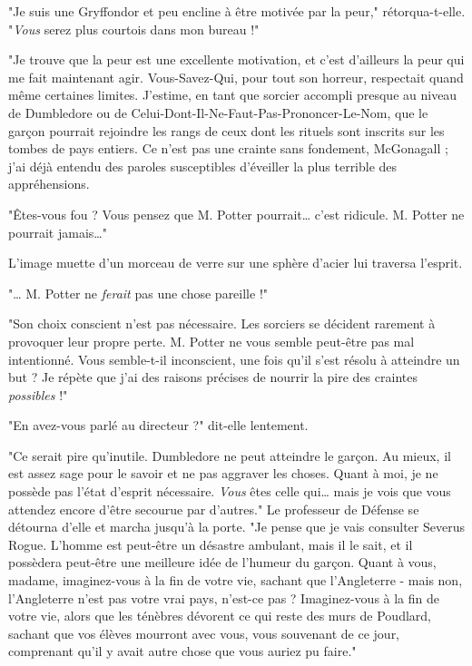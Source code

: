 "Je suis une Gryffondor et peu encline à être motivée par la peur," rétorqua-t-elle. "\emph{Vous}  serez plus courtois dans mon bureau !"

"Je trouve que la peur est une excellente motivation, et c'est d'ailleurs la peur qui me fait maintenant agir. Vous-Savez-Qui, pour tout son horreur, respectait quand même certaines limites. J'estime, en tant que sorcier accompli presque au niveau de Dumbledore ou de Celui-Dont-Il-Ne-Faut-Pas-Prononcer-Le-Nom, que le garçon pourrait rejoindre les rangs de ceux dont les rituels sont inscrits sur les tombes de pays entiers. Ce n'est pas une crainte sans fondement, McGonagall ; j'ai déjà entendu des paroles susceptibles d'éveiller la plus terrible des appréhensions.

"Êtes-vous fou ? Vous pensez que M. Potter pourrait… c'est ridicule. M. Potter ne pourrait jamais…"

L'image muette d'un morceau de verre sur une sphère d'acier lui traversa l'esprit.

"… M. Potter ne \emph{ferait}  pas une chose pareille !"

"Son choix conscient n'est pas nécessaire. Les sorciers se décident rarement à provoquer leur propre perte. M. Potter ne vous semble peut-être pas mal intentionné. Vous semble-t-il inconscient, une fois qu'il s'est résolu à atteindre un but ? Je répète que j'ai des raisons précises de nourrir la pire des craintes \emph{possibles}  !"

"En avez-vous parlé au directeur ?" dit-elle lentement.

"Ce serait pire qu'inutile. Dumbledore ne peut atteindre le garçon. Au mieux, il est assez sage pour le savoir et ne pas aggraver les choses. Quant à moi, je ne possède pas l'état d'esprit nécessaire. \emph{Vous}  êtes celle qui… mais je vois que vous attendez encore d'être secourue par d'autres." Le professeur de Défense se détourna d'elle et marcha jusqu'à la porte. "Je pense que je vais consulter Severus Rogue. L'homme est peut-être un désastre ambulant, mais il le sait, et il possèdera peut-être une meilleure idée de l'humeur du garçon. Quant à vous, madame, imaginez-vous à la fin de votre vie, sachant que l'Angleterre - mais non, l'Angleterre n'est pas votre vrai pays, n'est-ce pas ? Imaginez-vous à la fin de votre vie, alors que les ténèbres dévorent ce qui reste des murs de Poudlard, sachant que vos élèves mourront avec vous, vous souvenant de ce jour, comprenant qu'il y avait autre chose que vous auriez pu faire."

